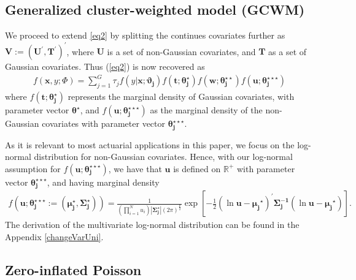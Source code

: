 \documentclass[11pt,letterpaper]{article}
\numberwithin{equation}{section}
\numberwithin{equation}{section}
\numberwithin{equation}{section}
\begin{document}
\subsection{Generalized cluster-weighted model (GCWM) }
We proceed to extend \eqref{eq2} by splitting the  continues covariates further as $\bm{V}:=(\bm U^{'}, \bm T^{'})^{'}$, where $\bm{U}$ is a set of non-Gaussian covariates, and $\bm{T}$ as a set of Gaussian  covariates.  Thus (\ref{eq2}) is now recovered as
\begin{align}
 f(\bm x, y; \Phi)= \sum_{j=1}^{G} \tau_j f(y|\bm{x};\bm{\vartheta_j})f(\bm{t};\bm{\theta_j^{\star}})f(\bm{w};\bm{\theta_j^{\star\star}})f(\bm{u};\bm{\theta_j^{\star\star\star}})
\label{eq3}
\end{align}
where $f(\bm{t};\bm{\theta_j^{\star}})$ represents the marginal density of Gaussian covariates, with parameter vector $\bm{\theta^{\star}}$, and $f(\bm{u};\bm{\theta_j^{\star\star\star}})$ as the marginal density of the non-Gaussian covariates with parameter vector $ \bm{ \theta_j^{\star\star\star}} $.


As it is relevant to most actuarial applications in this paper, we focus on the  log-normal distribution  for non-Gaussian covariates. Hence, with our log-normal assumption for $f(\bm{u};\bm{\theta_j^{\star\star\star}})$, we have that $\bm{u}$ is defined on $\mathbb{R}^+$ with parameter vector $ \bm{\theta_j^{\star\star\star}} $, and having marginal density
\begin{align} f \left(  \bm{u}; \bm{\theta_j^{\star\star\star}} := ( \bm{\mu_j^\star} ,\bm{ \Sigma _j^\star } ) \right) = \frac{1}{(\prod_{i=1}^{N}u_{i})|\bm{ \Sigma_j^\star} |(2 \pi)^{\frac{p}{2}}}   \exp\left[-\frac{1}{2}(\ln\bm{ u}-\bm{\mu_j}^\star)^{'}\bm{\Sigma_j^{-1}}(\ln \bm {u}-\bm{\mu_j}^\star)\right].
\end{align} The derivation of the multivariate log-normal distribution can be found in the Appendix \ref{changeVarUni}.


\subsection{Zero-inflated Poisson}%
\end{document}
